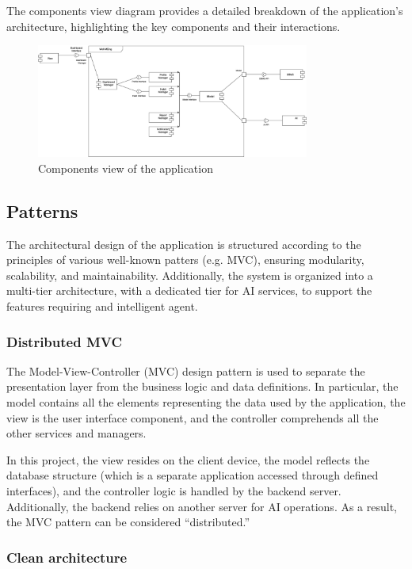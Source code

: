 \documentclass{article}
\begin{document}
The components view diagram provides a detailed breakdown of the application's architecture, highlighting the key components and their interactions.
\begin{figure}
    \centering
    \includegraphics[width=0.8\textwidth]{images/ComponentView.png}
    \caption{Components view of the application}
    \label{fig:components_diagram}
\end{figure}

\subsection{Patterns}

The architectural design of the application is structured according to the principles of various well-known patters (e.g. MVC), ensuring modularity, scalability, and maintainability.
Additionally, the system is organized into a multi-tier architecture, with a dedicated tier for AI services, to support the features requiring and intelligent agent.

\subsubsection{Distributed MVC}

The Model-View-Controller (MVC) design pattern is used to separate the presentation layer from the business logic and data definitions.
In particular, the model contains all the elements representing the data used by the application, the view is the user interface component, and the controller comprehends all the other services and managers.

In this project, the view resides on the client device, the model reflects the database structure (which is a separate application accessed through defined interfaces), and the controller logic is handled by the backend server.
Additionally, the backend relies on another server for AI operations.
As a result, the MVC pattern can be considered “distributed.”

\subsubsection{Clean architecture}
\end{document}
